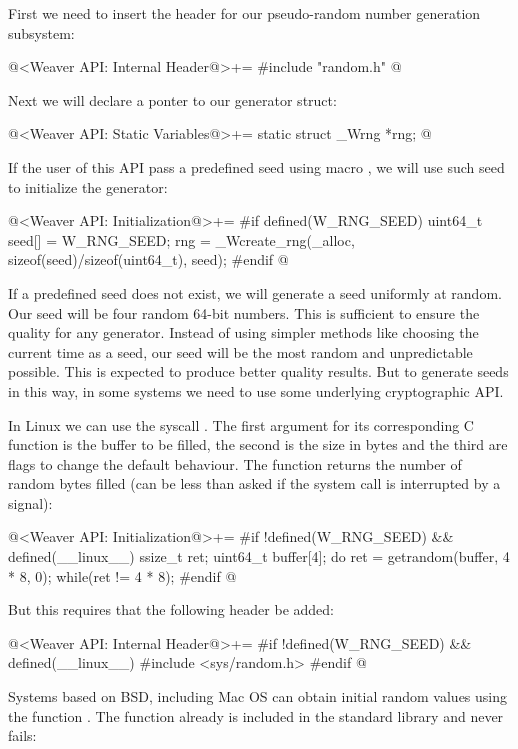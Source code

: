 
First we need to insert the header for our pseudo-random number
generation subsystem:

\iniciocodigo
@<Weaver API: Internal Header@>+=
#include "random.h"
@
\fimcodigo

Next we will declare a ponter to our generator struct:

\iniciocodigo
@<Weaver API: Static Variables@>+=
static struct _Wrng *rng;
@
\fimcodigo

If the user of this API pass a predefined seed using
macro , we will use such seed to initialize the
generator:

\iniciocodigo
@<Weaver API: Initialization@>+=
#if defined(W_RNG_SEED)
{
  uint64_t seed[] = W_RNG_SEED;
  rng = _Wcreate_rng(_alloc, sizeof(seed)/sizeof(uint64_t),
                     seed);
}
#endif
@
\fimcodigo

If a predefined seed does not exist, we will generate a seed uniformly
at random. Our seed will be four random 64-bit numbers. This is
sufficient to ensure the quality for any generator. Instead of using
simpler methods like choosing the current time as a seed, our seed
will be the most random and unpredictable possible. This is expected
to produce better quality results. But to generate seeds in this way,
in some systems we need to use some underlying cryptographic API.

In Linux we can use the syscall . The first
argument for its corresponding C function is the buffer to be filled,
the second is the size in bytes and the third are flags to change the
default behaviour. The function returns the number of random bytes
filled (can be less than asked if the system call is interrupted by a
signal):

\iniciocodigo
@<Weaver API: Initialization@>+=
#if !defined(W_RNG_SEED) && defined(__linux__)
{
  ssize_t ret;
  uint64_t buffer[4];
  do{
    ret = getrandom(buffer, 4 * 8, 0);
  }while(ret != 4 * 8);
}
#endif
@
\fimcodigo

But this requires that the following header be added:

\iniciocodigo
@<Weaver API: Internal Header@>+=
#if !defined(W_RNG_SEED) && defined(__linux__)
#include <sys/random.h>
#endif
@
\fimcodigo

Systems based on BSD, including Mac OS can obtain initial random
values using the function . The function
already is included in the standard library and never fails:

